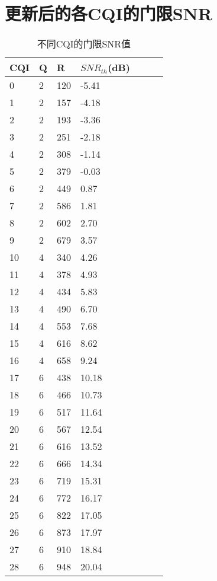 \documentclass{article}
\begin{document}
\section{更新后的各CQI的门限SNR}
\begin{table}[H]
	\caption{不同CQI的门限SNR值}
	\centering
	\begin{tabular}{|l|l|l|l|l|l|l|}%
		\hline  %
		CQI		& Q		& R		& $SNR_{th}$(dB)    \\
		\hline
		0		& 2		& 120	& -5.41 \\
		\hline
		1		& 2		& 157	& -4.18 \\
		\hline
		2		& 2		& 193	& -3.36 \\
		\hline
		3		& 2		& 251	& -2.18 \\
		\hline
		4		& 2		& 308	& -1.14 \\
		\hline
		5		& 2		& 379	& -0.03 \\
		\hline
		6		& 2		& 449	& 0.87  \\
		\hline
		7		& 2		& 586	& 1.81  \\
		\hline
		8		& 2		& 602	& 2.70  \\
		\hline
		9		& 2		& 679	& 3.57  \\
		\hline
		10		& 4		& 340	& 4.26  \\
		\hline
		11		& 4		& 378	& 4.93  \\
		\hline
		12		& 4		& 434	& 5.83  \\
		\hline
		13		& 4		& 490	& 6.70  \\
		\hline
		14		& 4		& 553	& 7.68  \\
		\hline
		15		& 4		& 616	& 8.62 \\
		\hline
		16		& 4		& 658	& 9.24 \\
		\hline
		17		& 6		& 438	& 10.18 \\
		\hline
		18		& 6		& 466	& 10.73 \\
		\hline
		19		& 6		& 517	& 11.64 \\
		\hline
		20		& 6		& 567	& 12.54 \\
		\hline
		21		& 6		& 616	& 13.52 \\
		\hline
		22		& 6		& 666	& 14.34 \\
		\hline
		23		& 6		& 719	& 15.31 \\
		\hline
		24		& 6		& 772	& 16.17 \\
		\hline
		25		& 6		& 822	& 17.05 \\
		\hline
		26		& 6		& 873	& 17.97 \\
		\hline
		27		& 6		& 910	& 18.84 \\
		\hline
		28		& 6		& 948	& 20.04 \\
		\hline  %
	\end{tabular}
\end{table}
\end{document}
